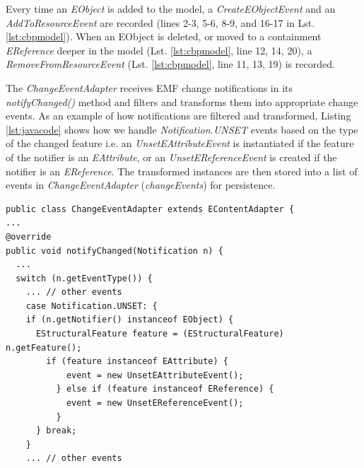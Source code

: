 \documentclass[conference]{IEEEtran}
\begin{document}

Every time an \emph{EObject} is added to the model, a \emph{CreateEObjectEvent} and an \emph{AddToResourceEvent} are recorded (lines 2-3, 5-6, 8-9, and 16-17 in Lst. \ref{lst:cbpmodel}). When an EObject is deleted, or moved to a containment \emph{EReference} deeper in the model (Lst. \ref{lst:cbpmodel}, line 12, 14, 20), a \emph{RemoveFromResourceEvent} (Lst. \ref{lst:cbpmodel}, line 11, 13, 19) is recorded.

The \emph{ChangeEventAdapter} receives EMF change notifications in its \emph{notifyChanged()} method and filters and transforms them into appropriate change events. As an example of how notifications are filtered and transformed, Listing \ref{lst:javacode} shows how we handle \emph{Notification.UNSET} events based on the type of the changed feature i.e. an \emph{UnsetEAttributeEvent} is instantiated if the feature of the notifier is an \emph{EAttribute}, or an \emph{UnsetEReferenceEvent}  is created if the notifier is an \emph{EReference}. The transformed instances are then stored into a list of events in \emph{ChangeEventAdapter} (\emph{changeEvents}) for persistence. 

\begin{lstlisting}[style=java,caption={Simplified Java code to handle notification events.},label=lst:javacode]
public class ChangeEventAdapter extends EContentAdapter {
...
@override
public void notifyChanged(Notification n) {
  ...
  switch (n.getEventType()) {
    ... // other events
    case Notification.UNSET: {
    if (n.getNotifier() instanceof EObject) {
      EStructuralFeature feature = (EStructuralFeature) n.getFeature();
        if (feature instanceof EAttribute) {
            event = new UnsetEAttributeEvent();
          } else if (feature instanceof EReference) {
            event = new UnsetEReferenceEvent();
          }
      } break;
    } 
    ... // other events
\end{lstlisting}	
\end{document}
